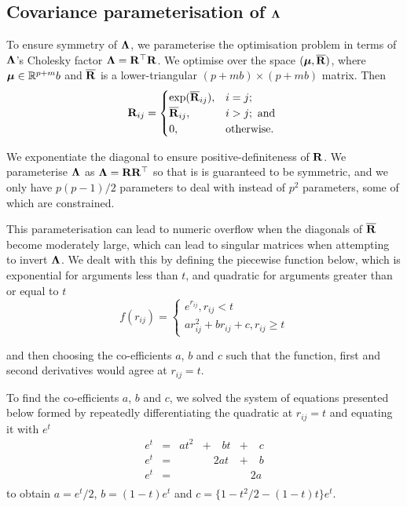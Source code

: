 \subsection{Covariance parameterisation of ${\boldsymbol \Lambda}$}
To ensure symmetry of ${\boldsymbol \Lambda}$, we parameterise the optimisation problem in
terms of ${\boldsymbol \Lambda}$'s Cholesky factor  ${\boldsymbol \Lambda} = {\bf R}^\top {\bf R}$. We optimise
over the space $({\boldsymbol \mu}, \overline{{\bf R}})$, where ${\boldsymbol \mu} \in {\mathbb{R}}^{p + m}b$ and
$\overline{{\bf R}}$ is a lower-triangular $(p + mb) \times (p + mb)$ matrix. Then
\begin{equation*}
	{\bf R}_{ij} =
	\begin{cases}
		\exp(\overline{{\bf R}}_{ij}), & i = j;\\
		\overline{{\bf R}}_{ij},       & i > j; \text{ and }\\
		0,                         & \text{otherwise}. 
	\end{cases}
\end{equation*}
		
\noindent We exponentiate the diagonal to ensure positive-definiteness of
${\bf R}$. We parameterise ${\boldsymbol \Lambda}$ as ${\boldsymbol \Lambda} = {\bf R} {\bf R}^\top$ so that is is
guaranteed to be symmetric, and we only have $p(p-1)/2$ parameters to deal with
instead of $p^2$ parameters, some of which are constrained. 

This parameterisation can lead to numeric overflow when the diagonals of
$\overline{{\bf R}}$ become moderately large, which can lead to singular matrices
when attempting to invert ${\boldsymbol \Lambda}$. We dealt with this by defining the
piecewise function below, which is exponential for arguments less than $t$, and
quadratic for arguments greater than or equal to $t$
\begin{equation}
\label{eq:piecewise_function}
f(r_{ij}) =
\begin{cases}
	e^{r_{ij}}, r_{ij} < t                   \\
	a r_{ij}^2 + b r_{ij} + c, r_{ij} \geq t 
\end{cases}
\end{equation}

\noindent and then choosing the co-efficients $a$, $b$ and $c$ such that the
function, first and second derivatives would agree at $r_{ij} = t$.

To find the co-efficients $a$, $b$ and $c$, we solved the system of equations
presented below formed by repeatedly  differentiating the quadratic at $r_{ij}
=  t$ and equating it with $e^t$
\begin{equation}
\label{eq:system_of_equations}
\begin{array}{lllll}
	e^t & = & a t^2 & + \quad b t & + \quad c \\
	e^t & = &       & \quad 2a t  & + \quad b \\
	e^t & = &       &             & \quad 2a  \\
\end{array}
\end{equation}
\noindent to obtain $a = e^t / 2$, $b = (1 - t) e^t$ and $c = \{1 - t^2/2 - (1 - t) t\} e^t$.

